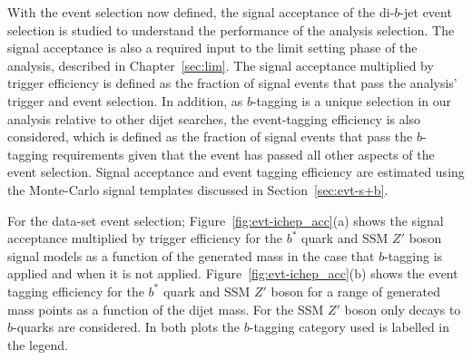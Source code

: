 \newpage 
With the event selection now defined,
the signal acceptance of the di-$b$-jet event selection is studied
to understand the performance of the analysis selection.
The signal acceptance is also a required input to the limit setting phase of the analysis, described in Chapter~\ref{sec:lim}.
The signal acceptance multiplied by trigger efficiency is defined as the 
fraction of signal events that pass the analysis' trigger and event selection.
In addition, as $b$-tagging is a unique selection in our analysis relative to other dijet searches,
the event-tagging efficiency is also considered, which is defined as the fraction of signal events that pass
the $b$-tagging requirements given that the event has passed all other aspects of the event selection.
Signal acceptance and event tagging efficiency are estimated using the
Monte-Carlo signal templates discussed in Section~\ref{sec:evt-s+b}.

For the \summer{} data-set event selection;
Figure~\ref{fig:evt-ichep_acc}(a) shows the signal acceptance multiplied by trigger efficiency
for the $b^*$ quark and SSM $Z'$ boson signal models
as a function of the generated mass
in the case that $b$-tagging is applied and when it is not applied.
Figure~\ref{fig:evt-ichep_acc}(b) shows the event tagging efficiency
for the $b^*$ quark and SSM $Z'$ boson for a range of generated mass points
as a function of the dijet mass.
For the SSM $Z'$ boson only decays to $b$-quarks are considered.
In both plots the $b$-tagging category used is labelled in the legend.

